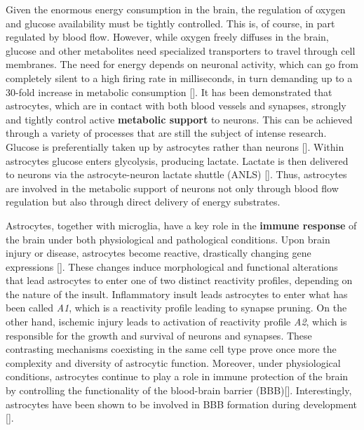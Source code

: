 Given the enormous energy consumption in the brain, the regulation of oxygen and glucose availability must be tightly controlled.
This is, of course, in part regulated by blood flow. 
However, while oxygen freely diffuses in the brain, glucose and other metabolites need specialized transporters to travel through cell membranes.
The need for energy depends on neuronal activity, which can go from completely silent to a high firing rate in milliseconds, in turn demanding up to a 30-fold increase in metabolic consumption [\cite{attwell2001}]. 
It has been demonstrated that astrocytes, which are in contact with both blood vessels and synapses, strongly and tightly control active \textbf{metabolic support} to neurons. 
This can be achieved through a variety of processes that are still the subject of intense research. 
Glucose is preferentially taken up by astrocytes rather than neurons [\cite{pellerin2007}]. 
Within astrocytes glucose enters glycolysis, producing lactate.
Lactate is then delivered to neurons via the astrocyte-neuron lactate shuttle (ANLS) [\cite{pellerin1994}]. 
Thus, astrocytes are involved in the metabolic support of neurons not only through blood flow regulation but also through direct delivery of energy substrates. 

Astrocytes, together with microglia, have a key role in the \textbf{immune response} of the brain under both physiological and pathological conditions.
Upon brain injury or disease, astrocytes become reactive, drastically changing gene expressions [\cite{zamanian2012}].
These changes induce morphological and functional alterations that lead astrocytes to enter one of two distinct reactivity profiles, depending on the nature of the insult. 
Inflammatory insult leads astrocytes to enter what has been called \textit{A1}, which is a reactivity profile leading to synapse pruning.
On the other hand, ischemic injury leads to activation of reactivity profile \textit{A2}, which is responsible for the growth and survival of neurons and synapses. 
These contrasting mechanisms coexisting in the same cell type prove once more the complexity and diversity of astrocytic function. 
Moreover, under physiological conditions, astrocytes continue to play a role in immune protection of the brain by controlling the functionality of the blood-brain barrier (BBB)[\cite{almutairi2016factors}]. 
Interestingly, astrocytes have been shown to be involved in BBB formation during development [\cite{hayashi1997}]. 

